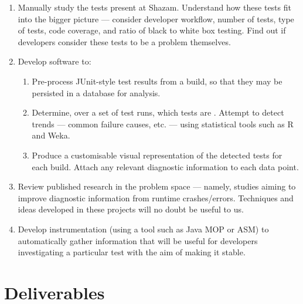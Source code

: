 \begin{enumerate}
	\item{
		Manually study the \flaky tests present at Shazam. Understand how these
		tests fit into the bigger picture --- consider developer workflow, number of
		tests, type of tests, code coverage, and ratio of black to white box
		testing. Find out if developers consider these tests to be a problem
		themselves.
	}
	\item{
		Develop software to:
		\begin{enumerate}
			\item{
				Pre-process JUnit-style test results from a build, so that they may be
				persisted in a database for analysis.
			}
			\item{
				Determine, over a set of test runs, which tests are \flaky. Attempt to
				detect trends --- common failure causes, etc. --- using statistical
				tools such as R and Weka.
			}
			\item{
				Produce a customisable visual representation of the detected \flaky
				tests for each build. Attach any relevant diagnostic information to each
				data point.
			}
		\end{enumerate}
	}
	\item{
		Review published research in the problem space --- namely, studies aiming to
		improve diagnostic information from runtime crashes/errors. Techniques and
		ideas developed in these projects will no doubt be useful to us.
	}
	\item{
		Develop instrumentation (using a tool such as Java MOP or ASM) to
		automatically gather information that will be useful for developers
		investigating a particular test with the aim of making it stable.
	}
\end{enumerate}

\tocless\section{Deliverables}

